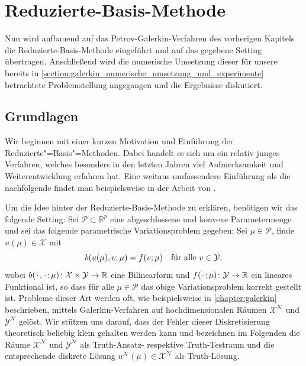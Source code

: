 \documentclass[../main.tex]{subfiles}
\begin{document}
\chapter{Reduzierte-Basis-Methode} %
\label{chapter:rbm}


Nun wird aufbauend auf das Petrov-Galerkin-Verfahren des vorherigen Kapitels die Reduzierte-Basis-Methode eingeführt und auf das gegebene Setting übertragen.
Anschließend wird die numerische Umsetzung dieser für unsere bereits in \cref{section:galerkin_numerische_umsetzung_und_experimente} betrachtete Problemstellung angegangen und die Ergebnisse diskutiert.

\section{Grundlagen} %
\label{sub:grb:rb:grundlagen}

Wir beginnen mit einer kurzen Motivation und Einführung der Reduzierte"=Basis"=Methoden.
Dabei handelt es sich um ein relativ junges Verfahren, welches besonders in den letzten Jahren viel Aufmerksamkeit und Weiterentwicklung erfahren hat.
Eine weitaus umfassendere Einführung als die nachfolgende findet man beispielsweise in der Arbeit von \textcite{Patera:2007un}.

Um die Idee hinter der Reduzierte-Basis-Methode zu erklären, benötigen wir das folgende Setting: Sei $\mathcal P \subset \mathbb{R}^{p}$ eine abgeschlossene und konvexe Parametermenge und sei das folgende parametrische Variationsproblem gegeben:
Sei $\mu \in \mathcal P$, finde $u(\mu) \in \mathcal X$ mit
\begin{equation}
    \label{eq:rbm_varprob_allgemein}
    b(u(\mu), v; \mu) = f(v; \mu) \quad \fa v \in \mathcal Y,
\end{equation}
wobei $b({\mkern2mu\cdot\mkern2mu}, {\mkern2mu\cdot\mkern2mu}; \mu) \colon \mathcal X \times \mathcal Y \to \mathbb{R}$ eine Bilinearform und $f({\mkern2mu\cdot\mkern2mu}; \mu) \colon \mathcal Y \to \mathbb{R}$ ein lineares Funktional ist, so dass für alle $\mu \in \mathcal P$ das obige Variationsproblem korrekt gestellt ist.
Probleme dieser Art werden oft, wie beispielsweise in \cref{chapter:galerkin} beschrieben, mittels Galerkin-Verfahren auf hochdimensionalen Räumen $\mathcal X^{\mathcal N}$ und $\mathcal Y^{\mathcal N}$ gelöst.
Wir stützen uns darauf, dass der Fehler dieser Diskretisierung theoretisch beliebig klein gehalten werden kann und bezeichnen im Folgenden die Räume $\mathcal X^{\mathcal N}$ und $\mathcal Y^{\mathcal N}$ als Truth-Ansatz- respektive Truth-Testraum und die entsprechende diskrete Lösung $u^{\mathcal N}(\mu) \in \mathcal X^{\mathcal N}$ als Truth-Lösung.
\end{document}
